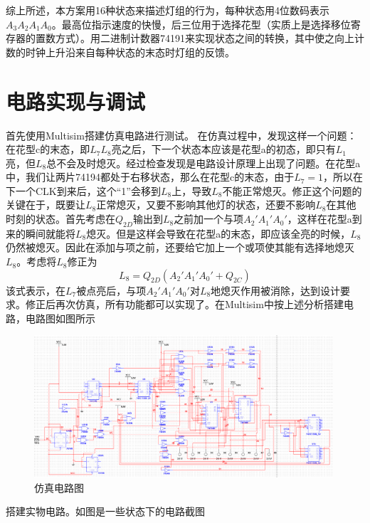 \documentclass{ctexart}
\begin{document}
综上所述，本方案用16种状态来描述灯组的行为，每种状态用4位数码表示$A_3 A_2 A_1 A_0$。最高位指示速度的快慢，后三位用于选择花型（实质上是选择移位寄存器的置数方式）。用二进制计数器74191来实现状态之间的转换，其中使之向上计数的时钟上升沿来自每种状态的末态时灯组的反馈。
\section{电路实现与调试}
首先使用Multisim搭建仿真电路进行测试。
在仿真过程中，发现这样一个问题：在花型c的末态，即$L_7L_8$亮之后，下一个状态本应该是花型a的初态，即只有$L_1$亮，但$L_8$总不会及时熄灭。经过检查发现是电路设计原理上出现了问题。在花型a中，我们让两片74194都处于右移状态，那么在花型c的末态，由于$L_7=1$，所以在下一个CLK到来后，这个“1”会移到$L_8$上，导致$L_8$不能正常熄灭。修正这个问题的关键在于，既要让$L_8$正常熄灭，又要不影响其他灯的状态，还要不影响$L_8$在其他时刻的状态。首先考虑在$Q_{2D}$输出到$L_8$之前加一个与项$A_2'A_1'A_0'$，这样在花型a到来的瞬间就能将$L_8$熄灭。但是这样会导致在花型a的末态，即应该全亮的时候，$L_8$仍然被熄灭。因此在添加与项之前，还要给它加上一个或项使其能有选择地熄灭$L_8$。考虑将$L_8$修正为
\begin{equation}
    L_8=Q_{2D}(A_2'A_1'A_0'+Q_{2C})
\end{equation}
该式表示，在$L_7$被点亮后，与项$A_2'A_1'A_0'$对$L_8$地熄灭作用被消除，达到设计要求。修正后再次仿真，所有功能都可以实现了。在Multisim中按上述分析搭建电路，电路图如图所示
\begin{figure}[H]
    \centering
    \includegraphics[width=0.99\textwidth]{multisim.png}
    \caption{仿真电路图}
\end{figure}
搭建实物电路。如图是一些状态下的电路截图
\end{document}
